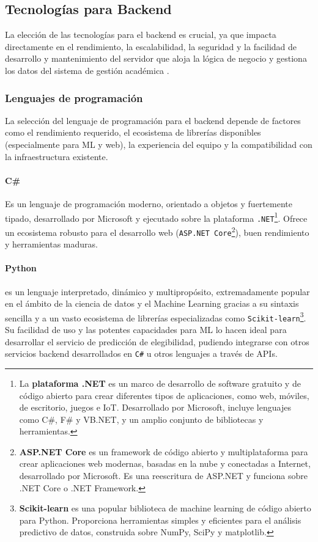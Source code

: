 \subsection{Tecnologías para Backend}
La elección de las tecnologías para el backend es crucial, ya que impacta directamente en el rendimiento, la escalabilidad, la seguridad y la facilidad de desarrollo y mantenimiento del servidor que aloja la lógica de negocio y gestiona los datos del sistema de gestión académica \parencite{FowlerBackend}.

\subsubsection{Lenguajes de programación}
La selección del lenguaje de programación para el backend depende de factores como el rendimiento requerido, el ecosistema de librerías disponibles (especialmente para ML y web), la experiencia del equipo y la compatibilidad con la infraestructura existente.

\paragraph{C\#}
Es un lenguaje de programación moderno, orientado a objetos y fuertemente tipado, desarrollado por Microsoft y ejecutado sobre la plataforma \texttt{.NET}\footnote{La \textbf{plataforma .NET} es un marco de desarrollo de software gratuito y de código abierto para crear diferentes tipos de aplicaciones, como web, móviles, de escritorio, juegos e IoT.
Desarrollado por Microsoft, incluye lenguajes como C\#, F\# y VB.NET, y un amplio conjunto de bibliotecas y herramientas.}.
Ofrece un ecosistema robusto para el desarrollo web (\texttt{ASP.NET Core}\footnote{\textbf{ASP.NET Core} es un framework de código abierto y multiplataforma para crear aplicaciones web modernas, basadas en la nube y conectadas a Internet, desarrollado por Microsoft.
Es una reescritura de ASP.NET y funciona sobre .NET Core o .NET Framework.}), buen rendimiento y herramientas maduras.

\paragraph{Python}
es un lenguaje interpretado, dinámico y multipropósito, extremadamente popular en el ámbito de la ciencia de datos y el Machine Learning gracias a su sintaxis sencilla y a un vasto ecosistema de librerías especializadas como \texttt{Scikit-learn}\footnote{\textbf{Scikit-learn} es una popular biblioteca de machine learning de código abierto para Python.
Proporciona herramientas simples y eficientes para el análisis predictivo de datos, construida sobre NumPy, SciPy y matplotlib.}.
Su facilidad de uso y las potentes capacidades para ML lo hacen ideal para desarrollar el servicio de predicción de elegibilidad, pudiendo integrarse con otros servicios backend desarrollados en \texttt{C\#} u otros lenguajes a través de APIs.

